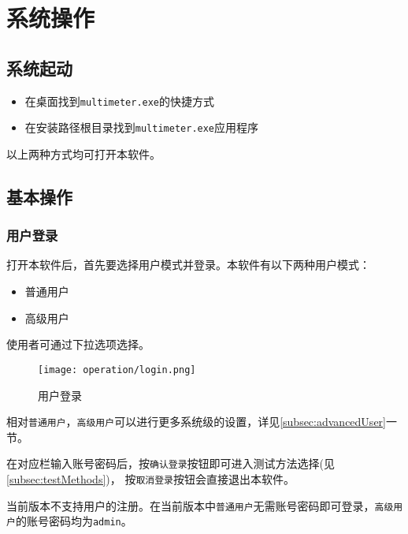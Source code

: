 \chapter{系统操作}
\section{系统起动}
\begin{itemize}
    \item 在桌面找到\lstinline{multimeter.exe}的快捷方式
    \item 在安装路径根目录找到\lstinline{multimeter.exe}应用程序
\end{itemize}
以上两种方式均可打开本软件。
\section{基本操作}
\subsection{用户登录}
打开本软件后，首先要选择用户模式并登录。本软件有以下两种用户模式：
\begin{itemize}
    \item 普通用户
    \item 高级用户
\end{itemize}
使用者可通过下拉选项选择。
\begin{figure}[htbp]
    \centering
    \texttt{[image: operation/login.png]}
    \caption{ 用户登录 \label{fig:login}}
\end{figure}
相对\lstinline{普通用户}，\lstinline{高级用户}可以进行更多系统级的设置，详见\ref{subsec:advancedUser}一节。

在对应栏输入账号密码后，按\lstinline{确认登录}按钮即可进入测试方法选择(见\ref{subsec:testMethods})，
按\lstinline{取消登录}按钮会直接退出本软件。
\begin{note}
    当前版本不支持用户的注册。在当前版本中\lstinline{普通用户}无需账号密码即可登录，\lstinline{高级用户}的账号密码均为\lstinline{admin}。
\end{note}
